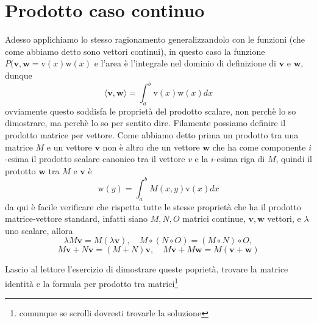 \documentclass[11pt,a4paper]{report}
\newcommand{\vettore}[1]{\mathbf{#1}}
\newcommand{\vettorec}[1]{\textrm{#1}}
\newcommand{\pscal}[2]{\langle \vettore{#1},\vettore{#2}\rangle}
\theoremstyle{definition}
\theoremstyle{plain}
\theoremstyle{plain}
\begin{document}
		\section{Prodotto caso continuo}
			Adesso applichiamo lo stesso ragionamento generalizzandolo con le funzioni (che come abbiamo detto sono vettori continui), in questo caso la funzione $P(\vettore v,\vettore w=\vettorec v(x)\vettorec w(x)$ e l'area è l'integrale nel dominio di definizione di $\vettore v$ e $\vettore w$, dunque
			\begin{equation}
				\pscal{v}{w}=\int_a^b \vettorec v(x)\vettorec w(x)dx
			\end{equation}
			ovviamente questo soddisfa le proprietà del prodotto scalare, non perchè lo so dimostrare, ma perchè lo so per sentito dire.\newline
			Filamente possiamo definire il prodotto matrice per vettore. Come abbiamo detto prima un prodotto tra una matrice $M$ e un vettore $\vettore v$ non è altro che un vettore $\vettore w$ che ha come componente $i$-esima il prodotto scalare canonico tra il vettore $v$ e la $i$-esima riga di $M$, quindi il prototto $\vettore w$ tra $M$ e $\vettore v$ è
			\begin{equation}
				\vettorec w(y)=\int_a^b M(x,y)\vettorec v(x) dx
			\end{equation}
			da qui è facile verificare che rispetta tutte le stesse proprietà che ha il prodotto matrice-vettore standard, infatti siano $M, N, O$ matrici continue, $\vettore v,\vettore w$ vettori, e $\lambda$ uno scalare, allora 
			\begin{equation}
				\lambda M\vettore v= M(\lambda \vettore v),\quad M\circ (N \circ O)= (M \circ N) \circ O,
			\end{equation}
			\[
				M\vettore v + N\vettore v=  (M+N)\vettore v,\quad M\vettore v+M\vettore w=M(\vettore v+\vettore w)
			\]
			
			Lascio al lettore l'esercizio di dimostrare queste poprietà, trovare la matrice identità e la formula per prodotto tra matrici\footnote{comunque se scrolli dovresti trovarle la soluzione}
		
\end{document}
